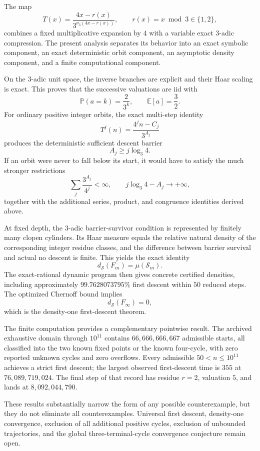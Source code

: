 \documentclass[11pt]{article}
\theoremstyle{definition}
\theoremstyle{remark}
\newcommand{\vthree}{\nu_3}
\newcommand{\Sset}{\mathcal S}
\newcommand{\Prob}{\mathbb P}
\newcommand{\E}{\mathbb E}
\newcommand{\ds}{d_{\Sset}}
\begin{document}
The map
\[
T(x)=\frac{4x-r(x)}{3^{\vthree(4x-r(x))}},
\qquad
r(x)=x\bmod3\in\{1,2\},
\]
combines a fixed multiplicative expansion by $4$ with a variable exact $3$-adic compression.  The present analysis separates its behavior into an exact symbolic component, an exact deterministic orbit component, an asymptotic density component, and a finite computational component.

On the $3$-adic unit space, the inverse branches are explicit and their Haar scaling is exact.  This proves that the successive valuations are iid with
\[
\Prob(a=k)=\frac2{3^k},
\qquad
\E[a]=\frac32.
\]
For ordinary positive integer orbits, the exact multi-step identity
\[
T^j(n)=\frac{4^jn-C_j}{3^{A_j}}
\]
produces the deterministic sufficient descent barrier
\[
A_j\ge j\log_3 4.
\]
If an orbit were never to fall below its start, it would have to satisfy the much stronger restrictions
\[
\sum_j\frac{3^{A_j}}{4^j}<\infty,
\qquad
j\log_3 4-A_j\to+\infty,
\]
together with the additional series, product, and congruence identities derived above.

At fixed depth, the $3$-adic barrier-survivor condition is represented by finitely many clopen cylinders.  Its Haar measure equals the relative natural density of the corresponding integer residue classes, and the difference between barrier survival and actual no descent is finite.  This yields the exact identity
\[
\ds(F_m)=\mu(\mathcal S_m).
\]
The exact-rational dynamic program then gives concrete certified densities, including approximately $99.7628073795\%$ first descent within $50$ reduced steps.  The optimized Chernoff bound implies
\[
\ds(F_\infty)=0,
\]
which is the density-one first-descent theorem.

The finite computation provides a complementary pointwise result.  The archived exhaustive domain through $10^{11}$ contains $66,666,666,667$ admissible starts, all classified into the two known fixed points or the known four-cycle, with zero reported unknown cycles and zero overflows.  Every admissible $50<n\le10^{11}$ achieves a strict first descent; the largest observed first-descent time is $355$ at $76,089,719,024$.  The final step of that record has residue $r=2$, valuation $5$, and lands at $8,092,044,790$.

These results substantially narrow the form of any possible counterexample, but they do not eliminate all counterexamples.  Universal first descent, density-one convergence, exclusion of all additional positive cycles, exclusion of unbounded trajectories, and the global three-terminal-cycle convergence conjecture remain open.
\end{document}
